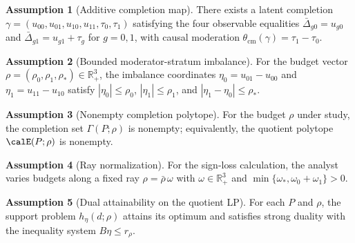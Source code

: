 \documentclass[11pt]{article}
\newcommand{\R}{\mathbb{R}}
\theoremstyle{definition}
\newtheorem{assumption}{Assumption}
\theoremstyle{plain}
\theoremstyle{remark}
\begin{document}
\begin{assumption}[Additive completion map]\label{ass:completion}
There exists a latent completion \(\gamma=(u_{00},u_{01},u_{10},u_{11},\tau_0,\tau_1)\) satisfying the four observable equalities \(\bar\Delta_{g0}=u_{g0}\) and \(\bar\Delta_{g1}=u_{g1}+\tau_g\) for \(g=0,1\), with causal moderation \(\theta_{\mathrm{cm}}(\gamma)=\tau_1-\tau_0\).
\end{assumption}

\begin{assumption}[Bounded moderator-stratum imbalance]\label{ass:budget}
For the budget vector \(\rho=(\rho_0,\rho_1,\rho_\ast)\in\R_+^3\), the imbalance coordinates \(\eta_0=u_{01}-u_{00}\) and \(\eta_1=u_{11}-u_{10}\) satisfy \(|\eta_0|\le \rho_0\), \(|\eta_1|\le \rho_1\), and \(|\eta_1-\eta_0|\le \rho_\ast\).
\end{assumption}

\begin{assumption}[Nonempty completion polytope]\label{ass:nonempty}
For the budget \(\rho\) under study, the completion set \(\Gamma(P;\rho)\) is nonempty; equivalently, the quotient polytope \(\calE(P;\rho)\) is nonempty.
\end{assumption}

\begin{assumption}[Ray normalization]\label{ass:ray}
For the sign-loss calculation, the analyst varies budgets along a fixed ray \(\rho=\bar\rho\,\omega\) with \(\omega\in\R_+^3\) and \(\min\{\omega_\ast,\omega_0+\omega_1\}>0\).
\end{assumption}

\begin{assumption}[Dual attainability on the quotient LP]\label{ass:dual}
For each \(P\) and \(\rho\), the support problem \(h_\eta(d;\rho)\) attains its optimum and satisfies strong duality with the inequality system \(B\eta\le r_\rho\).
\end{assumption}
\end{document}

